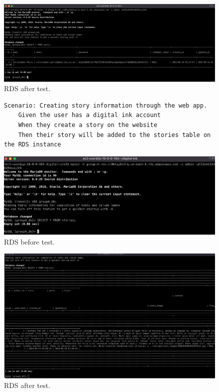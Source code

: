 \begin{figure}[!htbp]
    \centering
    \includegraphics[width=\textwidth]{resources/rds/rds-testing-user-added}
    \caption{RDS after test.}
    \label{fig:rds-testing-user-added}
\end{figure}

\clearpage
\begin{figure}[!htbp]
    \centering
    \begin{verbatim}
Scenario: Creating story information through the web app.
    Given the user has a digital ink account
    When they create a story on the website
    Then their story will be added to the stories table on the RDS instance
    \end{verbatim}
    \label{fig:create-story-data}
\end{figure}

\begin{figure}[!htbp]
    \centering
    \includegraphics[width=\textwidth]{resources/rds/rds-testing-stories-before}
    \caption{RDS before test.}
    \label{fig:rds-testing-stories-empty}
\end{figure}

\begin{figure}[!htbp]
    \centering
    \includegraphics[width=\textwidth]{resources/rds/rds-testing-stories-after}
    \caption{RDS after test.}
    \label{fig:rds-testing-story-added}
\end{figure}

